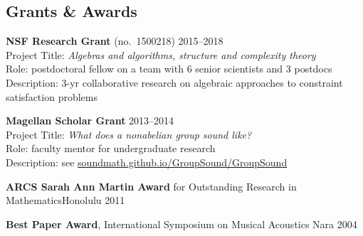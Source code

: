 \documentclass[margin,line]{resume}
\begin{document}
\begin{resume}

    
    \section{\mysidestyle Grants \& Awards}

    \textbf{NSF Research Grant} {\small (no.~1500218)} \hfill 2015--2018\\
    Project Title: \textsl{Algebras and algorithms, structure and complexity theory}\\ 
    Role: postdoctoral fellow on a team with 6 senior scientists and 3 postdocs\\
    Description: 3-yr collaborative research on algebraic approaches to constraint satisfaction problems

    \vspace{-1mm}
    \textbf{Magellan Scholar Grant} \hfill     2013--2014\\
    Project Title: \textsl{What does a nonabelian group sound like?}\\
    Role: faculty mentor for undergraduate research\\
    Description: see {\small \href{http://soundmath.github.io/GroupSound/}{soundmath.github.io/GroupSound/GroupSound}}

    \vspace{-2mm}
    \textbf{ARCS Sarah Ann Martin Award} for Outstanding Research in Mathematics\hfill Honolulu 2011

    \vspace{-2mm}
    \textbf{Best Paper Award}, International Symposium on Musical Acoustics \hfill Nara 2004 


\end{resume}
\end{document}
